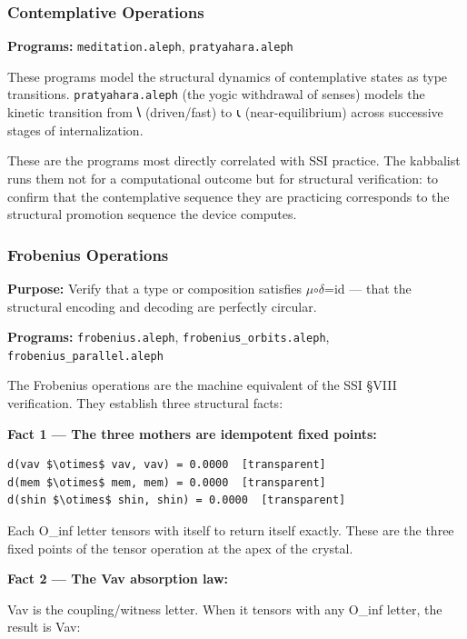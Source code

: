 \documentclass[12pt,a4paper]{article}
\newcommand{\pilcrow}{\S}
\begin{document}
\subsubsection{Contemplative Operations}

\textbf{Programs:} \texttt{meditation.\allowbreak aleph}, \texttt{pratyahara.\allowbreak aleph}

These programs model the structural dynamics of contemplative states as type transitions. \texttt{pratyahara.\allowbreak aleph} (the yogic withdrawal of senses) models the kinetic transition from 𐑘 (driven/fast) to 𐑧 (near-equilibrium) across successive stages of internalization.

These are the programs most directly correlated with SSI practice. The kabbalist runs them not for a computational outcome but for structural verification: to confirm that the contemplative sequence they are practicing corresponds to the structural promotion sequence the device computes.

\subsubsection{Frobenius Operations}

\textbf{Purpose:} Verify that a type or composition satisfies $\mu$$\circ$$\delta$=id --- that the structural encoding and decoding are perfectly circular.

\textbf{Programs:} \texttt{frobenius.\allowbreak aleph}, \texttt{frobenius\_\allowbreak orbits.\allowbreak aleph}, \texttt{frobenius\_\allowbreak parallel.\allowbreak aleph}

The Frobenius operations are the machine equivalent of the SSI \pilcrow{}VIII verification. They establish three structural facts:

\textbf{Fact 1 --- The three mothers are idempotent fixed points:}

\begin{lstlisting}
d(vav $\otimes$ vav, vav) = 0.0000  [transparent]
d(mem $\otimes$ mem, mem) = 0.0000  [transparent]
d(shin $\otimes$ shin, shin) = 0.0000  [transparent]
\end{lstlisting}

Each O\_inf letter tensors with itself to return itself exactly. These are the three fixed points of the tensor operation at the apex of the crystal.

\textbf{Fact 2 --- The Vav absorption law:}

Vav is the coupling/witness letter. When it tensors with any O\_inf letter, the result is Vav:
\end{document}
